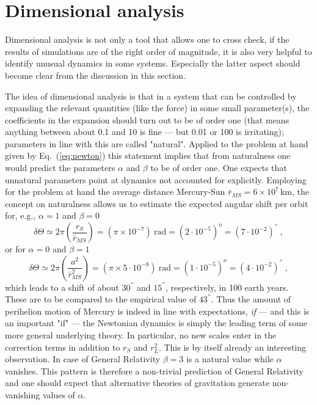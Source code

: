 \documentclass[12pt,ngerman,american]{iopart}
\begin{document}
\section{Dimensional analysis}\label{sec:analysis}

Dimensional analysis is not only a tool that allows one to cross check, if the results of simulations are of the right order of magnitude, it is also very helpful to identify unusual dynamics in some systems.
Especially the latter aspect should become clear from the discussion in this section.

The idea of dimensional analysis is that in a system that can be controlled by expanding the relevant quantities (like the force) in some small parameter(s), the coefficients in the expansion should turn out to be of order one (that means anything between about 0.1 and 10 is fine --- but 0.01 or 100 is irritating); parameters in line with this are called "natural".
Applied to the problem at hand given by Eq.~(\ref{eq:newton}) this statement implies that from naturalness one would predict the parameters $\alpha$ and $\beta$ to be
of order one.
One expects that unnatural parameters point at dynamics not accounted for explicitly.
Employing for the problem at hand the average distance Mercury-Sun $\bar r_{MS}=6\times 10^7\,\mathrm{km}$, the concept on 
naturalness allows us to estimate the expected angular shift per orbit for, e.g., $\alpha=1$ and $\beta=0$
\begin{equation}
\delta \Theta \simeq 2\pi\left(\frac{r_S}{\bar r_{MS}}\right) = (\pi \times 10^{-7}) \ \mbox{rad} = (2\cdot 10^{-5})^o = (7\cdot 10^{-2}) ^{''} \ ,
\end{equation}
or for $\alpha=0$ and $\beta=1$
\begin{equation}
\delta \Theta \simeq 2\pi\left(\frac{a^2}{\bar r^2_{MS}}\right) = (\pi \times 5 \cdot 10^{-8}) \ \mbox{rad} = (1 \cdot 10^{-5})^o = (4\cdot 10^{-2}) ^{''} \ ,
\end{equation}
which leads to a shift of about $30^{''}$ and $15^{''}$, respectively, in 100 earth years. These are to be compared to the empirical value of $43^{''}$.
Thus the amount of perihelion motion of Mercury is indeed in line with expectations, \textit{if} --- and this is an important "if" --- the 
Newtonian dynamics is simply the leading term of some more general underlying theory. 
 In particular, no new scales enter in the correction terms in addition to $r_S$ and $r_L^2$. This is by itself already an
 interesting observation.
 In case of General Relativity $\beta=3$ is a natural value 
while $\alpha$ vanishes. This pattern is therefore a non-trivial prediction of General Relativity and one should expect
that alternative theories of gravitation generate non-vanishing values of $\alpha$. 
\end{document}

